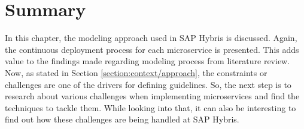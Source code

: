 \section{Summary}\label{section: hybris_architecture/problem_statement}
In this chapter, the modeling approach used in SAP Hybris is discussed. Again, the continuous deployment process for each microservice is presented. This adds value to the findings made regarding modeling process from literature review. Now, as stated in Section \ref{section:context/approach}, the constraints or challenges are one of the drivers for defining guidelines. So, the next step is to research about various challenges when implementing microservices and find the techniques to tackle them. While looking into that, it can also be interesting to find out how these challenges are being handled at SAP Hybris.












